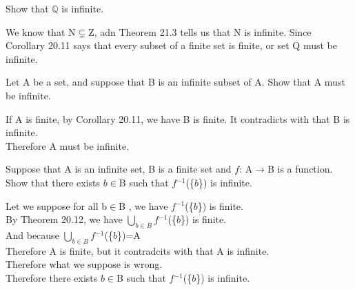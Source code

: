 \documentclass[11pt, a4paper, UTF8]{ctexart}
\begin{document}
\begin{problem}[UD:21.7]
Show that $\mathbb{Q}$ is infinite.
\end{problem}
\begin{solution}
We know that N$\subsetneq$Z, adn Theorem 21.3 tells us that N is infinite. Since Corollary 20.11 says that every subset of a finite set is finite, or set Q must be infinite.
\end{solution}



\begin{problem}[UD:21.9]
Let A be a set, and suppose that B is an infinite subset of A. Show that A must be infinite.
\end{problem}
\begin{solution}
If A is finite, by Corollary 20.11, we have B is finite. It contradicts with that B is infinite.\\
Therefore A must be infinite.
\end{solution}



\begin{problem}[UD:21.10]
Suppose that A is an infinite set, B is a finite set and $f$: A$\rightarrow$B is a function. Show that there exists $b\in$B such that $f$$^{-1}$(\{$b$\}) is infinite.
\end{problem}
\begin{solution}
Let we suppose for all b$\in$B , we have $f$$^{-1}$(\{$b$\}) is finite.\\
By Theorem 20.12, we have $\bigcup_{b\in B}$$f$$^{-1}$(\{$b$\}) is finite.\\
And because $\bigcup_{b\in B}$$f$$^{-1}$(\{$b$\})=A\\
Therefore A is finite, but it contradcits with that A is infinite.\\
Therefore what we suppose is wrong.\\
Therefore  there exists $b\in$B such that $f$$^{-1}$(\{$b$\}) is infinite.
\end{solution}
\end{document}
